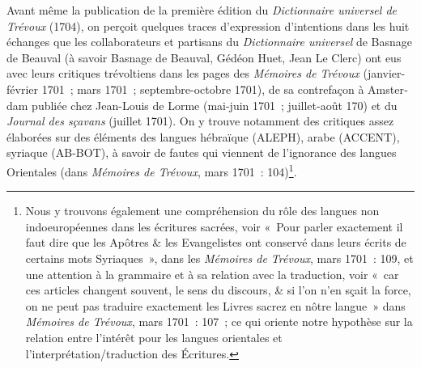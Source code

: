 \documentclass[output=paper,colorlinks,citecolor=brown,arabicfont,chinesefont,booklanguage=french]{langscibook}
\begin{document}
\begin{otherlanguage}{french}
Avant même la publication de la première édition du \emph{Dictionnaire universel de Trévoux} (1704), on perçoit quelques traces d’expression d’intentions dans les huit échanges que les collaborateurs et partisans du \emph{Dictionnaire universel} de Basnage de Beauval (à savoir Basnage de Beauval, Gédéon Huet, Jean Le Clerc) ont eus avec leurs critiques trévoltiens dans les pages des \emph{Mémoires de Trévoux} (janvier-février 1701~; mars 1701~; septembre-octobre 1701), de sa contrefaçon à Amsterdam publiée chez Jean-Louis de Lorme  (mai-juin 1701~; juillet-août 170) et du \emph{Journal des sçavans} (juillet 1701). On y trouve notamment des critiques assez élaborées sur des éléments des langues hébraïque (ALEPH), arabe (ACCENT), syriaque (AB-BOT), à savoir de fautes qui viennent de l’ignorance des langues Orientales  (dans \emph{Mémoires de Trévoux}, mars 1701~: 104)\footnote{Nous y trouvons également une compréhension du rôle des langues non indoeuropéennes dans les écritures sacrées, voir «~Pour parler exactement il faut dire que les Apôtres \& les Evangelistes ont conservé dans leurs écrits de certains mots Syriaques~», dans les \emph{Mémoires de Trévoux}, mars 1701~: 109,  et une attention à la grammaire et à sa relation avec la traduction, voir «~car ces articles changent souvent, le sens du discours, \& si l’on n’en sçait la force, on ne peut pas traduire exactement les Livres sacrez en nôtre langue~» dans \emph{Mémoires de Trévoux}, mars 1701~: 107~; ce qui oriente notre hypothèse sur la relation entre l’intérêt pour les langues orientales et l’interprétation/traduction des Écritures.}. 


\end{otherlanguage}
\end{document}
